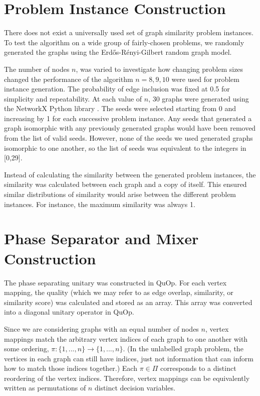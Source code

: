 \section{Problem Instance Construction}\label{sec:problem const}
There does not exist a universally used set of graph similarity problem instances. To test the algorithm on a wide group of fairly-chosen problems, we randomly generated the graphs using the Erdős-Rényi-Gilbert random graph model\cite{erdos_renyi,gilbert}.

The number of nodes $n$, was varied to investigate how changing problem sizes changed the performance of the algorithm $n=8,9,10$ were used for problem instance generation. The probability of edge inclusion was fixed at 0.5 for simplicity and repeatability. At each value of $n$, 30 graphs were generated using the NetworkX Python library \cite{networkx}. The seeds were selected starting from 0 and increasing by 1 for each successive problem instance. Any seeds that generated a graph isomorphic with any previously generated graphs would have been removed from the list of valid seeds. However, none of the seeds we used generated graphs isomorphic to one another, so the list of seeds was equivalent to the integers in [0,29].

Instead of calculating the similarity between the generated problem instances, the similarity was calculated between each graph and a copy of itself. This ensured similar distributions of similarity would arise between the different problem instances. For instance, the maximum similarity was always 1.

\section{Phase Separator and Mixer Construction}
The phase separating unitary was constructed in QuOp. For each vertex mapping, the quality (which we may refer to as edge overlap, similarity, or similarity score) was calculated and stored as an array. This array was converted into a diagonal unitary operator in QuOp.

Since we are considering graphs with an equal number of nodes $n$, vertex mappings match the arbitrary vertex indices of each graph to one another with some ordering, $\pi:\{1,...,n\}\to\{1,...,n\}$. (In the unlabelled graph problem, the vertices in each graph can still have indices, just not information that can inform how to match those indices together.) Each $\pi\in\Pi$ corresponds to a distinct reordering of the vertex indices. Therefore, vertex mappings can be equivalently written as permutations of $n$ distinct decision variables.

